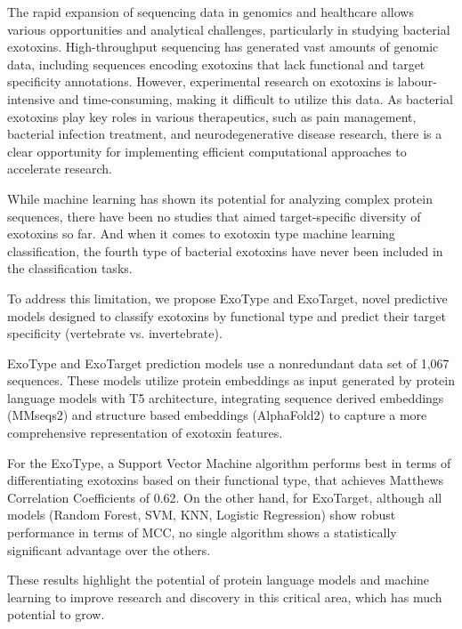 
The rapid expansion of sequencing data in genomics and healthcare allows various opportunities and analytical challenges, particularly in studying bacterial exotoxins.
High-throughput sequencing has generated vast amounts of genomic data, including sequences encoding exotoxins that lack functional and target specificity annotations.
However, experimental research on exotoxins is labour-intensive and time-consuming, making it difficult to utilize this data.
As bacterial exotoxins play key roles in various therapeutics, such as pain management, bacterial infection treatment, and neurodegenerative disease research, there is a clear opportunity for implementing efficient computational approaches to accelerate research.

While machine learning has shown its potential for analyzing complex protein sequences, there have been no studies that aimed target-specific diversity of exotoxins so far. And when it comes to exotoxin type machine learning classification, the fourth type of bacterial exotoxins have never been included in the classification tasks.

To address this limitation, we propose ExoType and ExoTarget, novel predictive models designed to classify exotoxins by functional type and predict their target specificity (vertebrate vs. invertebrate).

ExoType and ExoTarget prediction models use a nonredundant data set of 1,067 sequences.
These models utilize protein embeddings as input generated by protein language models with T5 architecture, integrating sequence derived embeddings (MMseqs2) and structure based embeddings (AlphaFold2) to capture a more comprehensive representation of exotoxin features.

For the ExoType, a Support Vector Machine algorithm performs best in terms of differentiating exotoxins based on their functional type, that achieves Matthews Correlation Coefficients of 0.62. 
On the other hand, for ExoTarget, although all models (Random Forest, \gls{SVM}, \gls{KNN}, Logistic Regression) show robust performance in terms of \gls{MCC}, no single algorithm shows a statistically significant advantage over the others.


These results highlight the potential of protein language models and machine learning to improve research and discovery in this critical area, which has much potential to grow.
